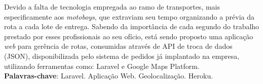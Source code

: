 
\begin{resumo}[RESUMO]
\begin{SingleSpacing}


Devido a falta de tecnologia empregada ao ramo de transportes, mais especificamente aos \textit{motoboys}, que extraviam seu tempo organizando a prévia da rota a cada lote de entrega. Sabendo da importância de cada segundo do trabalho prestado por esses profissionais ao seu ofício, está sendo proposto uma aplicação \textit{web} para gerência de rotas, consumidas através de API de troca de dados (JSON), disponibilizada pelo sistema de pedidos já implantado na empresa, utilizando ferramentas como: Laravel e Google Maps Platform. \\

\textbf{Palavras-chave}: Laravel. Aplicação Web. Geolocalização. Heroku.

\end{SingleSpacing}
\end{resumo}
